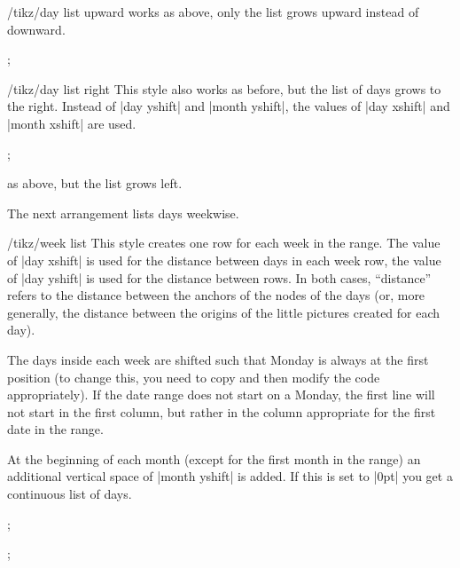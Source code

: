 \begin{stylekey}{/tikz/day list upward}
  works as above, only the list grows upward instead of downward.
\begin{codeexample}[]
\tikz
  \calendar [dates=2000-01-28 to 2000-02-03,
             day list upward,month yshift=1em];
\end{codeexample}
\end{stylekey}

\begin{stylekey}{/tikz/day list right}
  This style also works as before, but the list of days grows to the
  right. Instead of |day yshift| and |month yshift|, the values of
  |day xshift| and |month xshift| are used.
\begin{codeexample}[]
\tikz
  \calendar [dates=2000-01-28 to 2000-02-03,
             day list right,month xshift=1em];
\end{codeexample}
  as above, but the list grows left.
\end{stylekey}

The next arrangement lists days weekwise.

\begin{stylekey}{/tikz/week list}
  This style creates one row for each week in the range. The value
  of |day xshift| is used for the distance between days in each week
  row, the value of |day yshift| is used for the distance between
  rows. In both cases, ``distance''  refers to the distance between
  the anchors of the nodes of the days (or, more generally, the
  distance between the origins of the little pictures created for each
  day).

  The days inside each week are shifted such that Monday is always
  at the first position (to change this, you need to copy and then
  modify the code appropriately). If the date range does not start on
  a Monday, the first line will not start in the first column, but
  rather in the column appropriate for the first date in the range.

  At the beginning of each month (except for the first month in the
  range) an additional vertical space of |month yshift| is added. If
  this is set to |0pt| you get a continuous list of days.
\begin{codeexample}[]
\tikz
  \calendar [dates=2000-01-01 to 2000-02-last,week list];
\end{codeexample}
\begin{codeexample}[]
\tikz
  \calendar [dates=2000-01-01 to 2000-02-last,week list,
             month yshift=0pt];
\end{codeexample}
\end{stylekey}

